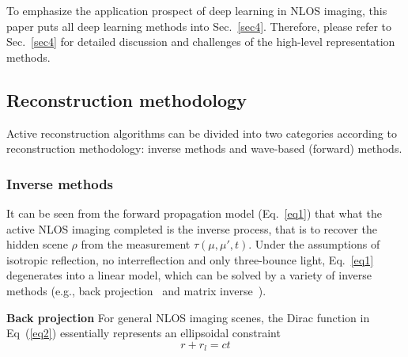 To emphasize the application prospect of deep learning in NLOS imaging, this paper puts all deep learning methods into Sec.~\ref{sec4}. Therefore, please refer to Sec.~\ref{sec4} for detailed discussion and challenges of the high-level representation methods.

\subsection{Reconstruction methodology}
\label{sec:active_reconstruct}
Active reconstruction algorithms can be divided into two categories according to reconstruction methodology: inverse methods and wave-based (forward) methods.

\subsubsection{Inverse methods}
It can be seen from the forward propagation model (Eq.~\ref{eq1}) that what the active NLOS imaging completed is the inverse process, that is to recover the hidden scene $\rho$ from the measurement $\tau(\mu,\mu',t)$. Under the assumptions of isotropic reflection, no interreflection and only three-bounce light, Eq.~\ref{eq1} degenerates into a linear model, which can be solved by a variety of inverse methods (e.g., back projection~\cite{arellanoFastBackprojectionNonline2017,mannaErrorBackprojectionAlgorithms2018,veltenRecoveringThreedimensionalShape2012} and matrix inverse~\cite{heideDiffuseMirrors3D2014,otooleConfocalNonlineofsightImaging2018}).

\vspace{0.8mm}
\noindent \textbf{Back projection}
For general NLOS imaging scenes, the Dirac function in Eq~(\ref{eq2}) essentially represents an ellipsoidal constraint
\begin{equation}
    r + r_l = c t
\end{equation}

